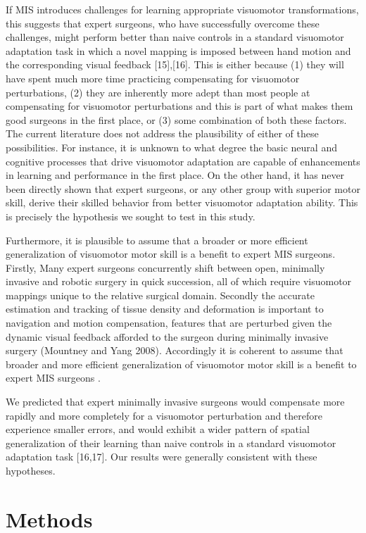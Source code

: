 \documentclass[jou, apacite, 11pt, longtable, floatsintext, notab]{apa6}
\begin{document}
If MIS introduces challenges for learning appropriate
visuomotor transformations, this suggests that expert
surgeons, who have successfully overcome these challenges,
might perform better than naive controls in a standard
visuomotor adaptation task in which a novel mapping is
imposed between hand motion and the corresponding visual
feedback
[15],[16].
This is either because (1) they will
have spent much more time practicing compensating for
visuomotor perturbations, (2) they are inherently more adept
than most people at compensating for visuomotor
perturbations and this is part of what makes them good
surgeons in the first place, or (3) some combination of both
these factors. The current literature does not address the
plausibility of either of these possibilities. For instance,
it is unknown to what degree the basic neural and cognitive
processes that drive visuomotor adaptation are capable of
enhancements in learning and performance in the first place.
On the other hand, it has never been directly shown that
expert surgeons, or any other group with superior motor
skill, derive their skilled behavior from better visuomotor
adaptation ability. This is precisely the hypothesis we
sought to test in this study.

Furthermore, it is plausible to assume that a broader or
more efficient generalization of visuomotor motor skill is a
benefit to expert MIS surgeons. Firstly, Many expert
surgeons concurrently shift between open, minimally invasive
and robotic surgery in quick succession, all of which
require visuomotor mappings unique to the relative surgical
domain. Secondly the accurate estimation and tracking of
tissue density and deformation is important to navigation
and motion compensation, features that are perturbed given
the dynamic visual feedback afforded to the surgeon during
minimally invasive surgery (Mountney and Yang 2008).
Accordingly it is coherent to assume that broader and more
efficient generalization of visuomotor motor skill is a
benefit to expert MIS surgeons .

We predicted that expert minimally invasive surgeons would
compensate more rapidly and more completely for a visuomotor
perturbation and therefore experience smaller errors, and
would exhibit a wider pattern of spatial generalization
of their learning than naive controls in a standard
visuomotor adaptation task
[16,17].
Our results were
generally consistent with these hypotheses.

\section{Methods}
\end{document}
